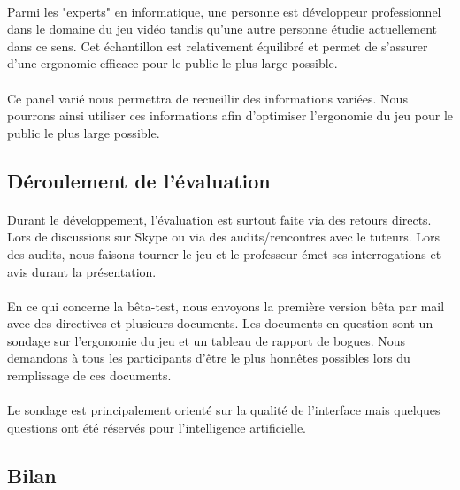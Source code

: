 \documentclass[11pt]{article} %
\begin{document}
\begin{sffamily}
\paragraph{}
Parmi les "experts" en informatique, une personne est développeur professionnel dans le domaine du jeu vidéo tandis qu'une autre personne étudie actuellement dans ce sens. Cet échantillon est relativement équilibré et permet de s'assurer d'une ergonomie efficace pour le public le plus large possible.

\paragraph{}
Ce panel varié nous permettra de recueillir des informations variées. Nous pourrons ainsi utiliser ces informations afin d'optimiser l'ergonomie du jeu pour le public le plus large possible.

\subsection{Déroulement de l'évaluation}
\paragraph{}
Durant le développement, l’évaluation est surtout faite via des retours directs. Lors de discussions sur Skype ou via des audits/rencontres avec le tuteurs. Lors des audits, nous faisons tourner le jeu et le professeur émet ses interrogations et avis durant la présentation. 
\paragraph{}
En ce qui concerne la bêta-test, nous envoyons la première version bêta par mail avec des directives et plusieurs documents. Les documents en question sont un sondage sur l'ergonomie du jeu et un tableau de rapport de bogues. Nous demandons à tous les participants d'être le plus honnêtes possibles lors du remplissage de ces documents.
\paragraph{}
Le sondage est principalement orienté sur la qualité de l'interface mais quelques questions ont été réservés pour l'intelligence artificielle. 

\subsection{Bilan}


\end{sffamily}
\end{document}
